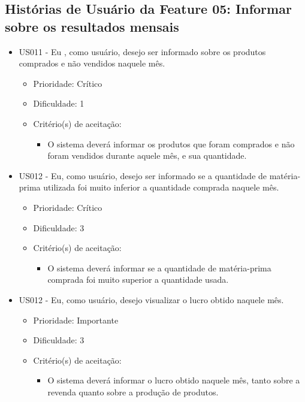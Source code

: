 \subsection{Histórias de Usuário da Feature 05: Informar sobre os resultados mensais}

\begin{itemize}


\item US011 - Eu , como usuário, desejo ser informado sobre os produtos comprados e não vendidos naquele mês.
    \begin{itemize}
    \item Prioridade: Crítico
    \item Dificuldade: 1
		  \item Critério(s) de aceitação:
			\begin{itemize}
				\item O sistema deverá informar os produtos que foram comprados e não foram vendidos durante aquele mês, e sua quantidade.
			\end{itemize}
    \end{itemize}

\item US012 - Eu, como usuário, desejo ser informado se a quantidade de matéria-prima utilizada foi muito inferior a quantidade comprada naquele mês.
    \begin{itemize}
    \item Prioridade: Crítico
    \item Dificuldade: 3
		  \item Critério(s) de aceitação:
			\begin{itemize}
				\item O sistema deverá informar se a quantidade de matéria-prima comprada foi muito superior a quantidade usada.
			\end{itemize}
    \end{itemize}

		\item US012 - Eu, como usuário, desejo visualizar o lucro obtido naquele mês.
		\begin{itemize}
		\item Prioridade: Importante
		\item Dificuldade: 3
			\item Critério(s) de aceitação:
			\begin{itemize}
				\item O sistema deverá informar o lucro obtido naquele mês, tanto sobre a revenda quanto sobre a produção de produtos.
			\end{itemize}
		\end{itemize}


\end{itemize}



